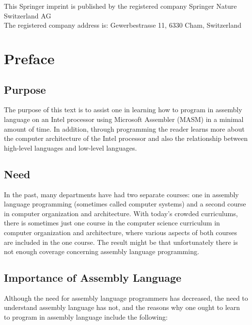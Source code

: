\documentclass[10pt]{book}
\begin{document}
This Springer imprint is published by the registered company Springer Nature Switzerland AG\\
The registered company address is: Gewerbestrasse 11, 6330 Cham, Switzerland


\chapter{Preface}
\section{Purpose}
The purpose of this text is to assist one in learning how to program in assembly language on an Intel processor using Microsoft Assembler (MASM) in a minimal amount of time. In addition, through programming the reader learns more about the computer architecture of the Intel processor and also the relationship between high-level languages and low-level languages.

\section{Need}
In the past, many departments have had two separate courses: one in assembly language programming (sometimes called computer systems) and a second course in computer organization and architecture. With today's crowded curriculums, there is sometimes just one course in the computer science curriculum in computer organization and architecture, where various aspects of both courses are included in the one course. The result might be that unfortunately there is not enough coverage concerning assembly language programming.

\section{Importance of Assembly Language}
Although the need for assembly language programmers has decreased, the need to understand assembly language has not, and the reasons why one ought to learn to program in assembly language include the following:
\end{document}
